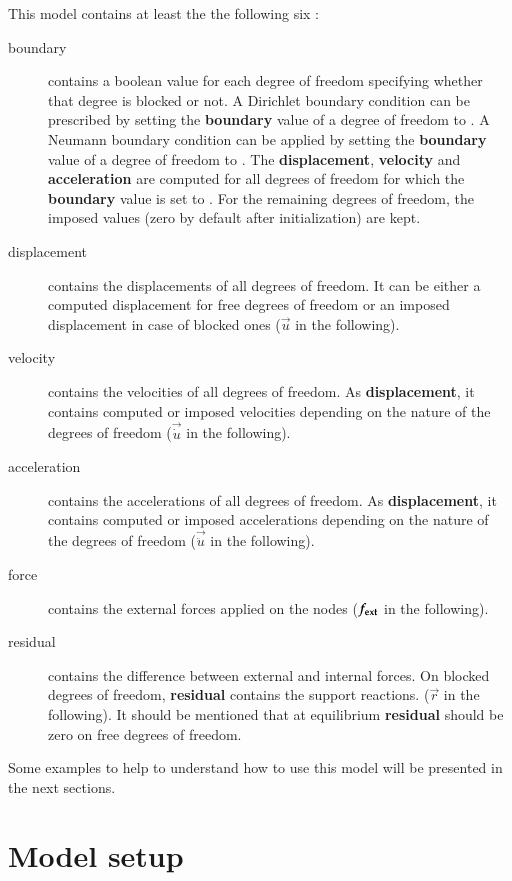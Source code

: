 This model contains at least the the following six :
\begin{description}
\item[boundary] contains a  boolean value for each degree  of freedom specifying
  whether that degree  is blocked or not. A Dirichlet  boundary condition can be
  prescribed by  setting the \textbf{boundary} value  of a degree  of freedom to
  .   A Neumann  boundary condition  can  be applied  by setting  the
  \textbf{boundary}  value  of  a   degree  of  freedom  to  .   The
  \textbf{displacement},   \textbf{velocity}   and   \textbf{acceleration}   are
  computed for all  degrees of freedom for which  the \textbf{boundary} value is
  set to . For the  remaining degrees of freedom, the imposed values
  (zero by default  after initialization) are kept.
\item[displacement] contains the displacements of all degrees of freedom. It can
  be either  a computed displacement for  free degrees of freedom  or an imposed
  displacement in case of blocked ones ($\vec{u}$ in the following).
\item[velocity]  contains  the  velocities   of  all  degrees  of  freedom.   As
  \textbf{displacement}, it contains computed or imposed velocities depending on
  the nature of the degrees of freedom ($\vec{\dot{u}}$ in the following).
\item[acceleration]  contains the accelerations  of all  degrees of  freedom. As
  \textbf{displacement}, it contains computed or imposed accelerations depending
  on the nature of the degrees of freedom ($\vec{\ddot{u}}$ in the following).
\item[force]   contains    the   external   forces   applied    on   the   nodes
  ($\boldsymbol{f_{{\mathrm{ext}}}}$ in the following).
\item[residual] contains the difference between external and internal forces. On
  blocked degrees of freedom,  \textbf{residual} contains the support reactions.
  ($\vec{r}$  in the  following).  It  should be  mentioned that  at equilibrium
  \textbf{residual} should be zero on free degrees of freedom.
\end{description}

Some examples to help to understand  how to use this model will be presented
in the next sections.

\section{Model setup}

